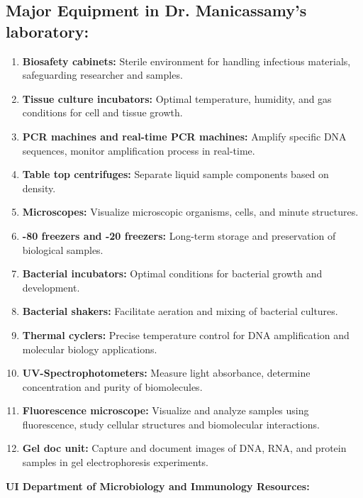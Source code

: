 \documentclass[onecolumn, compsoc,12pt]{IEEEtran}
\begin{document}
\subsection*{Major Equipment in Dr. Manicassamy's laboratory:}



\begin{enumerate}
\item \textbf{Biosafety cabinets:} Sterile environment for handling infectious materials, safeguarding researcher and samples.
\item \textbf{Tissue culture incubators:} Optimal temperature, humidity, and gas conditions for cell and tissue growth.
\item \textbf{PCR machines and real-time PCR machines:} Amplify specific DNA sequences, monitor amplification process in real-time.
\item \textbf{Table top centrifuges:} Separate liquid sample components based on density.
\item \textbf{Microscopes:} Visualize microscopic organisms, cells, and minute structures.
\item \textbf{-80 freezers and -20 freezers:} Long-term storage and preservation of biological samples.
\item \textbf{Bacterial incubators:} Optimal conditions for bacterial growth and development.
\item \textbf{Bacterial shakers:} Facilitate aeration and mixing of bacterial cultures.
\item \textbf{Thermal cyclers:} Precise temperature control for DNA amplification and molecular biology applications.
\item \textbf{UV-Spectrophotometers:} Measure light absorbance, determine concentration and purity of biomolecules.
\item \textbf{Fluorescence microscope:} Visualize and analyze samples using fluorescence, study cellular structures and biomolecular interactions.
\item \textbf{Gel doc unit:} Capture and document images of DNA, RNA, and protein samples in gel electrophoresis experiments.
\end{enumerate}

\textbf{UI Department of Microbiology and Immunology Resources:}
\end{document}

